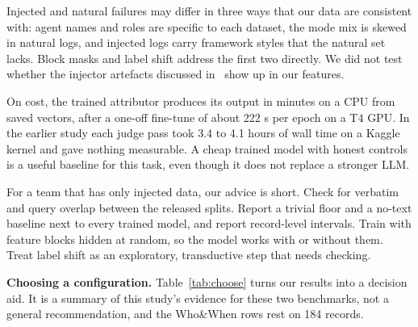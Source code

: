 \documentclass[conference]{IEEEtran}
\begin{document}
Injected and natural failures may differ in three ways that our data are consistent with: agent names and roles are specific to each dataset, the mode mix is skewed in natural logs, and injected logs carry framework styles that the natural set lacks. Block masks and label shift address the first two directly. We did not test whether the injector artefacts discussed in~\cite{audit1,audit2} show up in our features.

On cost, the trained attributor produces its output in minutes on a CPU from saved vectors, after a one-off fine-tune of about 222 s per epoch on a T4 GPU. In the earlier study each judge pass took 3.4 to 4.1 hours of wall time on a Kaggle kernel and gave nothing measurable. A cheap trained model with honest controls is a useful baseline for this task, even though it does not replace a stronger LLM.

For a team that has only injected data, our advice is short. Check for verbatim and query overlap between the released splits. Report a trivial floor and a no-text baseline next to every trained model, and report record-level intervals. Train with feature blocks hidden at random, so the model works with or without them. Treat label shift as an exploratory, transductive step that needs checking.

\textbf{Choosing a configuration.} Table~\ref{tab:choose} turns our results into a decision aid. It is a summary of this study's evidence for these two benchmarks, not a general recommendation, and the Who\&When rows rest on 184 records.
\end{document}
